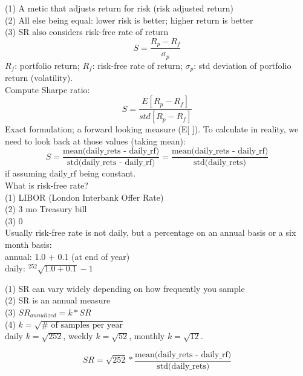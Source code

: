 \documentclass[12pt]{article}
\begin{document}
\noindent
(1) A metic that adjusts return for risk (risk adjusted return) \\
(2) All else being equal: lower risk is better; higher return is better \\
(3) SR also considers risk-free rate of return \\
\begin{equation}
S = \frac{R_p-R_f}{\sigma_p}
\end{equation}
$R_f$: portfolio return; $R_f$: risk-free rate of return; $\sigma_p$: std deviation of portfolio return (volatility). \\[8pt]
\noindent
Compute Sharpe ratio:
\begin{equation}
S = \frac{E[R_p-R_f]}{std[R_p-R_f]}
\end{equation}
Exact formulation; a forward looking measure (E[ ]). To calculate in reality, we need to look back at those values (taking mean):
\begin{equation}
S = \frac{\text{mean(daily\_rets - daily\_rf)}}{\text{std(daily\_rets - daily\_rf)}} = \frac{\text{mean(daily\_rets - daily\_rf)}}{\text{std(daily\_rets)}} 
\end{equation}
if assuming $\text{daily\_rf}$ being constant. \\[8pt]
\noindent 
What is risk-free rate?\\
(1) LIBOR (London Interbank Offer Rate) \\
(2) 3 mo Treasury bill \\
(3) 0 \\[8pt]
\noindent
Usually risk-free rate is not daily, but a percentage on an annual basis or a six month basis: \\
annual: 1.0 + 0.1 (at end of year) \\
daily: $^{252}\sqrt{1.0+0.1}-1$

\noindent
(1) SR can vary widely depending on how frequently you sample \\
(2) SR is an annual measure \\
(3) $SR_{annulized} = k * SR$ \\
(4) $k = \sqrt{\# \text{ of samples per year}}$ \\
daily $k=\sqrt{252}$, weekly $k=\sqrt{52}$, monthly $k=\sqrt{12}$. 

\begin{equation}
SR = \sqrt{252} * \frac{\text{mean(daily\_rets - daily\_rf)}}{\text{std(daily\_rets)}}
\end{equation}

\end{document}
